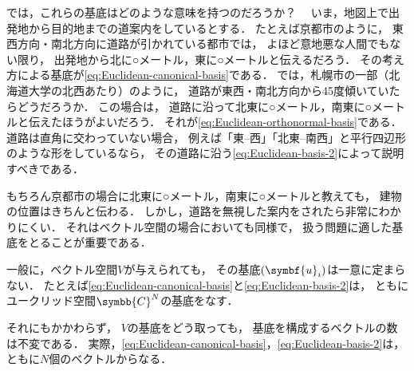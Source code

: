 \documentclass[
]{sotsu}
\begin{document}
では，これらの基底はどのような意味を持つのだろうか？　
いま，地図上で出発地から目的地までの道案内をしているとする．
たとえば京都市のように，
東西方向・南北方向に道路が引かれている都市では，
よほど意地悪な人間でもない限り，
出発地から\textsf{北に○メートル}，\textsf{東に○メートル}と伝えるだろう．
その考え方による基底が\cref{eq:Euclidean-canonical-basis}である．
では，札幌市の一部（北海道大学の北西あたり）のように，
道路が東西・南北方向から45度傾いていたらどうだろうか．
この場合は，
道路に沿って\textsf{北東に○メートル}，\textsf{南東に○メートル}と伝えたほうがよいだろう．
それが\cref{eq:Euclidean-orthonormal-basis}である．
道路は直角に交わっていない場合，
例えば「東--西」「北東--南西」と平行四辺形のような形をしているなら，
その道路に沿う\cref{eq:Euclidean-basis-2}によって説明すべきである．

もちろん京都市の場合に\textsf{北東に○メートル}，\textsf{南東に○メートル}と教えても，
建物の位置はきちんと伝わる．
しかし，道路を無視した案内をされたら非常にわかりにくい．
それはベクトル空間の場合においても同様で，
扱う問題に適した基底をとることが重要である．



\quad 
一般に，ベクトル空間$V$が与えられても，
その基底$\sequ{\symbf{u}_i}$は一意に定まらない．
たとえば\cref{eq:Euclidean-canonical-basis}と\cref{eq:Euclidean-basis-2}は，
ともにユークリッド空間$\symbb{C}^N$の基底をなす．

それにもかかわらず，
$V$の基底をどう取っても，
基底を構成するベクトルの数は不変である．
実際，\cref{eq:Euclidean-canonical-basis}，\cref{eq:Euclidean-basis-2}は，
ともに$N$個のベクトルからなる．
\end{document}
